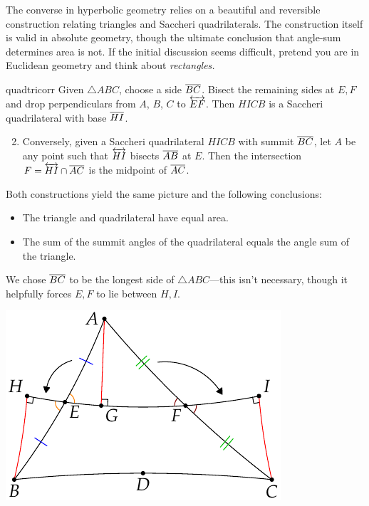 \goodbreak



The converse in hyperbolic geometry relies on a beautiful and reversible construction relating triangles and Saccheri quadrilaterals. The construction itself is valid in absolute geometry, though the ultimate conclusion that angle-sum determines area is not. If the initial discussion seems difficult, pretend you are in Euclidean geometry and think about \emph{rectangles.}

\begin{lemm}{}{quadtricorr}
	\exstart Given $\triangle ABC$, choose a side $\overline{BC}$. Bisect the remaining sides at $E,F$ and drop perpendiculars from $A$, $B$, $C$ to $\overleftrightarrow{EF}$. Then $HICB$ is a Saccheri quadrilateral with base $\overline{HI}$.\vspace{-5pt}
	\begin{enumerate}\setcounter{enumi}{1}
	  \item Conversely, given a Saccheri quadrilateral $HICB$ with summit $\overline{BC}$, let $A$ be any point such that $\overleftrightarrow{HI}$ bisects $\overline{AB}$ at $E$. Then the intersection $F=\overleftrightarrow{HI}\cap\overline{AC}$ is the midpoint of $\overline{AC}$.
	\end{enumerate}
	\begin{minipage}[t]{0.6\linewidth}\vspace{-5pt}
	Both constructions yield the same picture and the following conclusions:\vspace{-5pt}
	  \begin{itemize}\itemsep0pt
	    \item The triangle and quadrilateral have equal area.
	    \item The sum of the summit angles of the quadrilateral equals the angle sum of the triangle.
	  \end{itemize}
	  We chose $\overline{BC}$ to be the longest side of $\triangle ABC$---this isn't necessary, though it helpfully forces $E,F$ to lie between $H,I$.
	\end{minipage}
	\hfill
	\begin{minipage}[t]{0.39\linewidth}\vspace{-15pt}
		\flushright\includegraphics[scale=0.95]{area-saccheri4}
	\end{minipage}
\end{lemm}


